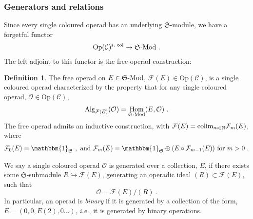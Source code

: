 \documentclass[11pt]{amsart}
\numberwithin{equation}{section}
\theoremstyle{definition}
\newtheorem{defn}[theo]{Definition}
\newtheorem{eg}[theo]{Example}
\newcommand{\mc}{\mathcal}
\newcommand{\mf}{\mathfrak}
\newcommand{\D}{{\mathcal{D}}}
\DeclareMathOperator{\Hom}{Hom}
\newcommand{\Mod}{{\textup{-Mod}}}
\newcommand{\colim}{{\textup{colim}}}
\newcommand{\triv}{{\textup{triv}}}
\newcommand{\Alg}{{\textup{Alg}}}
\newcommand{\Comm}{{\textup{Comm}}}
\newcommand{\op}{{\textup{op}}}
\newcommand{\Op}{{\textup{Op}}}
\newcommand{\Ass}{{\textup{Ass}}}
\newcommand{\CoAss}{{\textup{CoAss}}}
\newcommand{\CoComm}{{\textup{CoComm}}}
\newcommand{\Ss}{{{\mf{S}}}}
\newcommand{\CoAlg}{{\textup{CoAlg}}}
\newcommand{\CC}{{\textup{CC}}}
\newcommand{\0}{{\textbf{0}}}
\newcommand{\Cat}{{\textup{Cat}}}
\newcommand{\id}{{\textup{id}}}
\def\IN{\mathbb{N}}
\def\CC{{\mc C}}
\def\FF{{\mc F}}
\def\OO{{\mc O}}
\def \mf{\mathfrak}
\def \id{\mathbbm{1}}
\def \Op{\mathrm{Op}}
\def \ie{{\it i.e.}}
\begin{document}
%



\subsubsection{Generators and relations}
Since every single coloured operad has an underlying $\Ss$-module, we have a forgetful functor
\[
\Op(\CC)^\textup{s.\ col} \rightarrow \Ss\Mod~.
\]
The left adjoint to this functor is the free-operad construction:
\begin{defn}\label{freeopeg} 
The free operad on $E\in \Ss\Mod$, $\mc \FF(E)\in\Op(\CC)$, is a single coloured operad characterized by the property that for any single coloured operad, $\OO\in\Op(\CC)$,
\[
\Alg_{\mc F(E)}(\mc O) = \Hom_{\Ss\Mod}(E,\OO)~.
\]
The free operad admits an inductive construction, with $\FF(E) = \colim_{m\in \IN} \FF_m(E)$, where 
\[
\FF_0(E) = \id_\Ss~, \text{ and } \FF_m(E) = \id_\Ss\oplus (E\circ \FF_{m-1}(E))  \text{ for } m>0~.
\]
\end{defn}

We say a single coloured operad $\mc O$ is generated over a collection, $E$, if there exists some $\Ss$-submodule $R\hookrightarrow \FF(E)$, generating an operadic ideal $(R)\subset \FF(E)$, such that
\[
\OO = \FF(E)/(R)~.
\]
In particular, an operad is \emph{binary} if it is generated by a collection of the form, $E=(0,0,E(2),0\dots)$, \ie, it is generated by binary operations.
\end{document}

